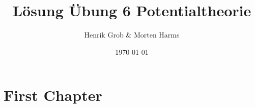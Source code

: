 \documentclass[12pt, a4paper,bibliography=totoc, twoside,BCOR=12.5mm,abstracton]{scrartcl}
\numberwithin{equation}{section}
\begin{document}
\title{Lösung Übung 6 Potentialtheorie}
\author{Henrik Grob \& Morten Harms}
\date{\today}
\maketitle


\tableofcontents
\thispagestyle{empty}
\newpage

\section{First Chapter}





 
\end{document}
